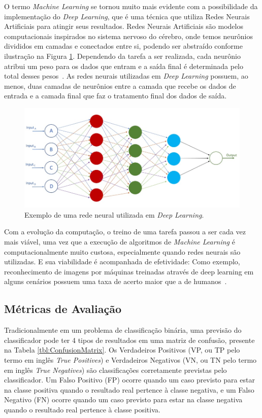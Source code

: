 \documentclass[portugues]{ic-tese}
\begin{document}
O termo \textit{Machine Learning} se tornou muito mais evidente com a possibilidade da implementação do \textit{Deep Learning}, que é uma técnica que utiliza Redes Neurais Artificiais para atingir seus resultados. Redes Neurais Artificiais são modelos computacionais inspirados no sistema nervoso do cérebro, onde temos neurônios divididos em camadas e conectados entre si, podendo ser abstraído conforme ilustração na Figura \ref{fig:NeuralNetwork}. Dependendo da tarefa a ser realizada, cada neurônio atribui um peso para os dados que entram e a saída final é determinada pelo total desses pesos~\citep{Copeland_2016}. As redes neurais utilizadas em \textit{Deep Learning} possuem, ao menos, duas camadas de neurônios entre a camada que recebe os dados de entrada e a camada final que faz o tratamento final dos dados de saída.

\begin{figure}[h]
\centering
\includegraphics[scale=0.8]{images/deep_neural_network.jpg}
\caption {Exemplo de uma rede neural utilizada em \textit{Deep Learning}.}
\label{fig:NeuralNetwork}
\end{figure}

Com a evolução da computação, o treino de uma tarefa passou a ser cada vez mais viável, uma vez que a execução de algoritmos de \textit{Machine Learning} é computacionalmente muito custosa, especialmente quando redes neurais são utilizadas. E sua viabilidade é acompanhada de efetividade: Como exemplo, reconhecimento de imagens por máquinas treinadas através de deep learning em alguns cenários possuem uma taxa de acerto maior que a de humanos~\citep{Copeland_2016}.

\subsection{Métricas de Avaliação}

Tradicionalmente em um problema de classificação binária, uma previsão do classificador pode ter 4 tipos de resultados em uma matriz de confusão, presente na Tabela \ref{tbl:ConfusionMatrix}. Os Verdadeiros Positivos (VP, ou TP pelo termo em inglês \textit{True Positives}) e Verdadeiros Negativos (VN, ou TN pelo termo em inglês \textit{True Negatives}) são classificações corretamente previstas pelo classificador. Um Falso Positivo (FP) ocorre quando um caso previsto para estar na classe positiva quando o resultado real pertence à classe negativa, e um Falso Negativo (FN) ocorre quando um caso previsto para estar na classe negativa
quando o resultado real pertence à classe positiva.
\end{document}
